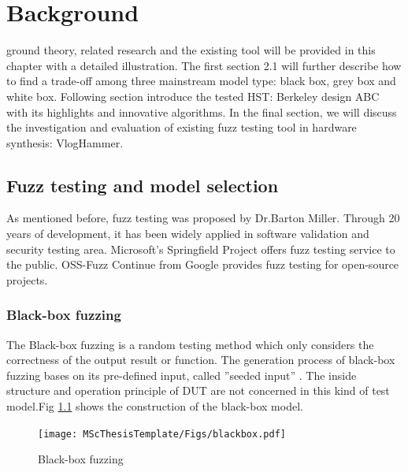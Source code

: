 \chapter{Background}
\renewcommand{\baselinestretch}{\mystretch}
\label{chap:Back}
 ground theory, related research and the existing tool will be provided in this chapter with a detailed illustration. The first section 2.1 will further describe how to find a trade-off among three mainstream model type: black box, grey box and white box. Following section introduce the tested HST: Berkeley design ABC with its highlights and innovative algorithms. In the final section, we will discuss the investigation and evaluation of existing fuzz testing tool in hardware synthesis: VlogHammer.
\section{Fuzz testing and model selection}
As mentioned before, fuzz testing was proposed by Dr.Barton Miller. Through 20 years of development, it has been widely applied in software validation and security testing area. Microsoft's Springfield Project offers fuzz testing service to the public. OSS-Fuzz Continue from Google provides fuzz testing for open-source projects. 
\subsection{Black-box fuzzing}
The Black-box fuzzing is a random testing method which only considers the correctness of the output result or function. The generation process of black-box fuzzing bases on its pre-defined input, called ''seeded input'' \cite{nidhra2012black}. The inside structure and operation principle of DUT are not concerned in this kind of test model.Fig \ref{fig:balckbox} shows the construction of the black-box model. 
\begin{figure}[htbp]
    \centering
    \texttt{[image: MScThesisTemplate/Figs/blackbox.pdf]}
    \caption{\footnotesize Black-box fuzzing}
    \label{fig:balckbox}
\end{figure}

